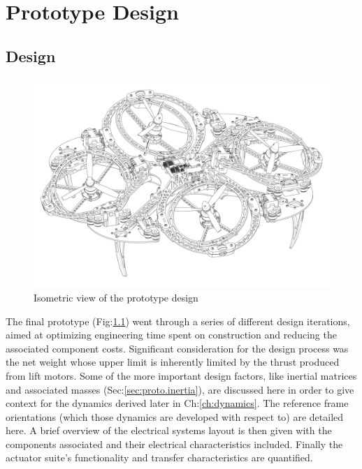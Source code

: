 \chapter{Prototype Design}
\label{ch:proto}
\section{Design}
\label{sec:proto.design}
\begin{figure}[htbp]
\centering
\includegraphics[width=\textwidth]{pdfpages/iso-design.pdf}
\vspace{-34pt}
\caption{Isometric view of the prototype design}
\vspace{-4pt}
\label{fig:iso-design}
\end{figure}
\par
The final prototype (Fig:\ref{fig:iso-design}) went through a series of different design iterations, aimed at optimizing engineering time spent on construction and reducing the associated component costs. Significant consideration for the design process was the net weight whose upper limit is inherently limited by the thrust produced from lift motors. Some of the more important design factors, like inertial matrices and associated masses (Sec:\ref{sec:proto.inertia}), are discussed here in order to give context for the dynamics derived later in Ch:\ref{ch:dynamics}. The reference frame orientations (which those dynamics are developed with respect to) are detailed here. A brief overview of the electrical systems layout is then given with the components associated and their electrical characteristics included. Finally the actuator suite's functionality and transfer characteristics are quantified.
